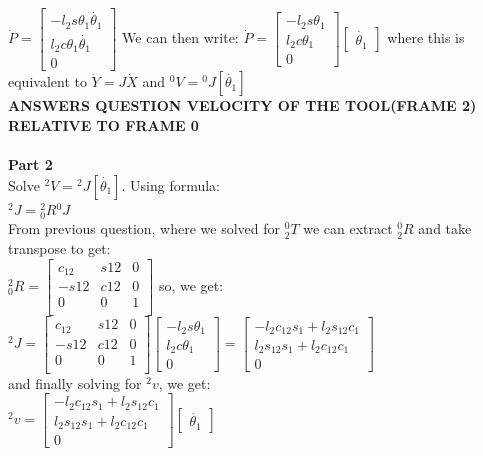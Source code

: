 \documentclass{article}
\begin{document}
$\dot{P}=\begin{bmatrix}
    -l_2s\theta_1 \dot{\theta_1}\\
    l_2c\theta_1 \dot{\theta_1}\\
    0
\end{bmatrix}$ We can then write: $\dot{P}=\begin{bmatrix}
    -l_2s\theta_1\\
    l_2c\theta_1\\
    0
\end{bmatrix}\begin{bmatrix}
    \dot{\theta_1}
\end{bmatrix}$ where this is equivalent to $\dot{Y}=J\dot{X}$ and ${}^0V={}^0J[\dot{\theta_1}]$\\
\textbf{ANSWERS QUESTION VELOCITY OF THE TOOL(FRAME 2) RELATIVE TO FRAME 0}\\\\
\textbf{Part 2}\\
Solve ${}^2V={}^2J[\dot{\theta_1}]$. Using formula:\\
${}^2J={}^2_0 R {}^0J$\\
From previous question, where we solved for ${}^0_2 T$ we can extract ${}^0_2 R$ and take transpose to get:\\
${}^2_0 R=\begin{bmatrix}
c_{12} & s{12} & 0 \\
-s{12} & c{12} & 0 \\
0 & 0 & 1\\
\end{bmatrix}$ so, we get:\\
${}^2J=\begin{bmatrix}
c_{12} & s{12} & 0 \\
-s{12} & c{12} & 0 \\
0 & 0 & 1\\
\end{bmatrix}
\begin{bmatrix}
-l_2s\theta_1\\
l_2c\theta_1\\
0
\end{bmatrix}=
\begin{bmatrix}
-l_2c_{12}s_1 + l_2s_{12}c_1\\
l_2s_{12}s_1 + l_2c_{12}c_1\\
0
\end{bmatrix}$\\ and finally solving for ${}^2v$, we get:\\
${}^2v=\begin{bmatrix}
-l_2c_{12}s_1 + l_2s_{12}c_1\\
l_2s_{12}s_1 + l_2c_{12}c_1\\
0
\end{bmatrix}\begin{bmatrix}
\dot{\theta_1}
\end{bmatrix}$
\end{document}

